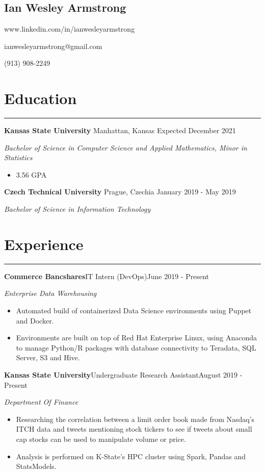 \documentclass[11pt]{article}
\newcommand{\name}[1]{\begin{center}\section*{\huge #1}\end{center}}
\newcommand{\topinfo}[1]{\begin{center}\vspace{-0.2cm}#1\vspace{-0.2cm}\end{center}}
\newcommand{\resumesection}[1]{\vspace{-0.2cm}\section*{#1}\vspace{-0.2cm}\hrule\vspace{0.2cm}}
\begin{document}
\name{Ian Wesley Armstrong}
\topinfo{www.linkedin.com/in/ianwesleyarmstrong}
\topinfo{ianwesleyarmstrong@gmail.com}
\topinfo{(913) 908-2249}

\resumesection{Education}
\textbf{Kansas State University} \hfill Manhattan, Kansas \hfill Expected December 2021  

\textit{Bachelor of Science in Computer Science and Applied Mathematics, Minor in Statistics}
\begin{itemize}
	\item 3.56 GPA
\end{itemize}

\textbf{Czech Technical University} \hfill Prague, Czechia \hfill January 2019 - May 2019 

\textit{Bachelor of Science in Information Technology }

\resumesection{Experience}
\textbf{Commerce Bancshares}\hfill{IT Intern (DevOps)}\hfill{June 2019 - Present} 

\textit{Enterprise Data Warehousing}
\begin{itemize}
	\item Automated build of containerized Data Science environments using Puppet and Docker.
	\item Environments are built on top of Red Hat Enterprise Linux, using Anaconda to manage Python/R packages with database connectivity to Teradata, SQL Server, S3 and Hive.
\end{itemize}

\textbf{Kansas State University}\hfill{Undergraduate Research Assistant}\hfill{August 2019 - Present} 

\textit{Department Of Finance}
\begin{itemize}
	\item Researching the correlation between a limit order book made from Nasdaq's ITCH data and tweets mentioning stock tickers to see if tweets about small cap stocks can be used to manipulate volume or price.
	\item Analysis is performed on K-State's HPC cluster using Spark, Pandas and StatsModels.
\end{itemize}
\end{document}
